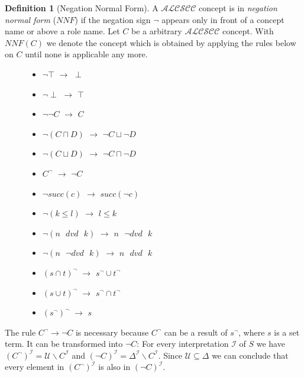 \documentclass[a4paper,11pt]{scrartcl}
\theoremstyle{break}
\theoremstyle{definition}
\newtheorem{mydef}{Definition}
\begin{document}
\begin{mydef}[Negation Normal Form]
A $\mathcal{ALCSCC}$ concept is in \textit{negation normal form} ($NNF$) if the negation sign $\neg$ appears only in front of a concept name or above a role name. Let $C$ be a arbitrary $\mathcal{ALCSCC}$ concept. With $NNF(C)$ we denote the concept which is obtained by applying the rules below on $C$ until none is applicable any more.
\begin{figure}[H]
\begin{minipage}[t]{.5\textwidth}
\raggedright
\begin{itemize}
\item $\neg\top$ $\rightarrow$ $\perp$
\item $\neg\perp$ $\rightarrow$ $\top$
\item $\neg\neg C$ $\rightarrow$ $C$
\item $\neg(C\sqcap D)$ $\rightarrow$ $\neg C \sqcup \neg D$
\item $\neg(C\sqcup D)$ $\rightarrow$ $\neg C \sqcap \neg D$
\item $C^\neg$ $\rightarrow$ $\neg C$
\item $\neg succ(c)$ $\rightarrow$ $succ(\neg c)$
\end{itemize}
\end{minipage}%
\begin{minipage}[t]{.5\textwidth}
\raggedleft
\begin{itemize}
\item $\neg (k\leq l)$ $\rightarrow$ $l\leq k$
\item $\neg (n\text{ } dvd \text{ } k)$ $\rightarrow$ $n\text{ } \neg dvd \text{ } k$
\item $\neg (n\text{ } \neg dvd \text{ } k)$ $\rightarrow$ $n\text{ } dvd \text{ } k$
\item $(s\cap t)^\neg$ $\rightarrow$ $s^\neg \cup t^\neg$
\item $(s\cup t)^\neg$ $\rightarrow$ $s^\neg \cap t^\neg$
\item $(s^\neg)^\neg$ $\rightarrow$ $s$
\end{itemize}
\end{minipage}
\end{figure}
\end{mydef}
The rule $C^\neg\rightarrow \neg C$ is necessary because $C^\neg$ can be a result of $s^\neg$, where $s$ is a set term. It can be transformed into $\neg C$: For every interpretation $\mathcal{I}$ of $S$ we have $(C^\neg)^\mathcal{I}=\mathcal{U}\backslash C^\mathcal{I}$ and $(\neg C)^\mathcal{I}=\Delta^\mathcal{I}\backslash C^\mathcal{I}$. Since $\mathcal{U}\subseteq \Delta$ we can conclude that every element in $(C^\neg)^\mathcal{I}$ is also in $(\neg C)^\mathcal{I}$.\\
\end{document}
